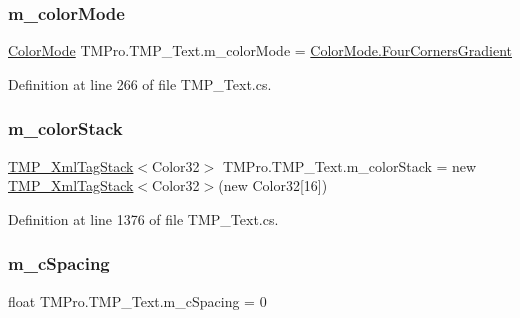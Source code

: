 \subsubsection{\texorpdfstring{m\_colorMode}{m\_colorMode}}
{\footnotesize\ttfamily \mbox{\hyperlink{namespace_t_m_pro_ad6c4f3ea250d747999f28f1f7678c4b3}{Color\+Mode}} T\+M\+Pro.\+T\+M\+P\+\_\+\+Text.\+m\+\_\+color\+Mode = \mbox{\hyperlink{namespace_t_m_pro_ad6c4f3ea250d747999f28f1f7678c4b3a67770dd4dc1eec40719e9e72336f234a}{Color\+Mode.\+Four\+Corners\+Gradient}}\hspace{0.3cm}{\ttfamily [protected]}}



Definition at line 266 of file T\+M\+P\+\_\+\+Text.\+cs.

\mbox{\label{class_t_m_pro_1_1_t_m_p___text_a5c58927bf5cf1522a0dbe2444d6c04c5}} 
\subsubsection{\texorpdfstring{m\_colorStack}{m\_colorStack}}
{\footnotesize\ttfamily \mbox{\hyperlink{struct_t_m_pro_1_1_t_m_p___xml_tag_stack}{T\+M\+P\+\_\+\+Xml\+Tag\+Stack}}$<$Color32$>$ T\+M\+Pro.\+T\+M\+P\+\_\+\+Text.\+m\+\_\+color\+Stack = new \mbox{\hyperlink{struct_t_m_pro_1_1_t_m_p___xml_tag_stack}{T\+M\+P\+\_\+\+Xml\+Tag\+Stack}}$<$Color32$>$(new Color32\mbox{[}16\mbox{]})\hspace{0.3cm}{\ttfamily [protected]}}



Definition at line 1376 of file T\+M\+P\+\_\+\+Text.\+cs.

\mbox{\label{class_t_m_pro_1_1_t_m_p___text_a8c6aa2c0d128cd8b4e296cda70d65aca}} 
\subsubsection{\texorpdfstring{m\_cSpacing}{m\_cSpacing}}
{\footnotesize\ttfamily float T\+M\+Pro.\+T\+M\+P\+\_\+\+Text.\+m\+\_\+c\+Spacing = 0\hspace{0.3cm}{\ttfamily [protected]}}



